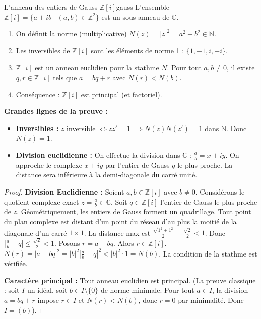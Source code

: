 \documentclass{prepacours}
\begin{document}
\begin{proposition}{L'anneau des entiers de Gauss $\mathbb{Z}[i]$}{gauss}
    L'ensemble $\mathbb{Z}[i] = \{a+ib \mid (a,b) \in \mathbb{Z}^2\}$ est un sous-anneau de $\mathbb{C}$.
    \begin{enumerate}
        \item On définit la norme (multiplicative) $N(z) = |z|^2 = a^2+b^2 \in \mathbb{N}$.
        \item Les inversibles de $\mathbb{Z}[i]$ sont les éléments de norme 1 : $\{1, -1, i, -i\}$.
        \item $\mathbb{Z}[i]$ est un anneau euclidien pour la stathme $N$. Pour tout $a, b \neq 0$, il existe $q, r \in \mathbb{Z}[i]$ tels que $a = bq + r$ avec $N(r) < N(b)$.
        \item Conséquence : $\mathbb{Z}[i]$ est principal (et factoriel).
    \end{enumerate}
\end{proposition}

\noindent \textbf{Grandes lignes de la preuve :}
\begin{itemize}
    \item \textbf{Inversibles :} $z$ inversible $\iff z z' = 1 \implies N(z)N(z') = 1$ dans $\mathbb{N}$. Donc $N(z)=1$.
    \item \textbf{Division euclidienne :} On effectue la division dans $\mathbb{C}$ : $\frac{a}{b} = x + iy$. On approche le complexe $x+iy$ par l'entier de Gauss $q$ le plus proche. La distance sera inférieure à la demi-diagonale du carré unité.
\end{itemize}

\begin{proof}
    \textbf{Division Euclidienne :}
    Soient $a, b \in \mathbb{Z}[i]$ avec $b \neq 0$. Considérons le quotient complexe exact $z = \frac{a}{b} \in \mathbb{C}$.
    Soit $q \in \mathbb{Z}[i]$ l'entier de Gauss le plus proche de $z$.
    Géométriquement, les entiers de Gauss forment un quadrillage. Tout point du plan complexe est distant d'un point du réseau d'au plus la moitié de la diagonale d'un carré $1 \times 1$.
    La distance max est $\frac{\sqrt{1^2+1^2}}{2} = \frac{\sqrt{2}}{2} < 1$.
    Donc $| \frac{a}{b} - q | \le \frac{\sqrt{2}}{2} < 1$.
    Posons $r = a - bq$. Alors $r \in \mathbb{Z}[i]$.
    $N(r) = |a - bq|^2 = |b|^2 \left| \frac{a}{b} - q \right|^2 < |b|^2 \cdot 1 = N(b)$.
    La condition de la stathme est vérifiée.
    
    \textbf{Caractère principal :}
    Tout anneau euclidien est principal. (La preuve classique : soit $I$ un idéal, soit $b \in I \setminus \{0\}$ de norme minimale. Pour tout $a \in I$, la division $a=bq+r$ impose $r \in I$ et $N(r) < N(b)$, donc $r=0$ par minimalité. Donc $I = (b)$).
\end{proof}
\end{document}
